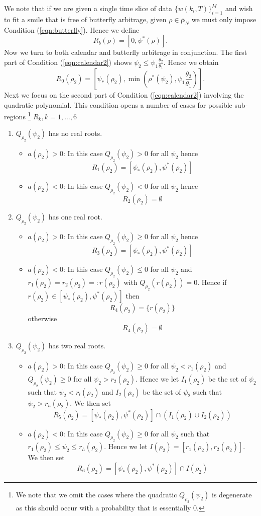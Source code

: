 \documentclass[11pt,letterpaper]{article}
\begin{document}
We note that if we are given a single time slice of data $\{w(k_i,T)\}_{i=1}^M$ and wish to fit a smile that is free of butterfly arbitrage, given $\rho \in \pmb{\rho}_N$ we must only impose Condition (\ref{eqn:butterfly}). Hence we define 
\[
R_b(\rho) = [0,\psi^*(\rho)].
\]
Now we turn to both calendar and butterfly arbitrage in conjunction. The first part of Condition (\ref{eqn:calendar2}) shows $\psi_2 \leq \psi_1 \frac{\theta_2}{\theta_1}$. Hence we obtain 
\[
R_0(\rho_2) = [\psi_*(\rho_2), \min(\rho^*(\psi_2), \psi_1 \frac{\theta_2}{\theta_1} )].
\]
Next we focus on the second part of Condition (\ref{eqn:calendar2}) involving the quadratic polynomial. This condition opens a number of cases for possible sub-regions \footnote{We note that we omit the cases where the quadratic $Q_{\rho_2}(\psi_2)$ is degenerate as this should occur with a probability that is essentially 0.} $R_k, k = 1,\ldots,6$ 
\begin{enumerate}
\item $Q_{\rho_2}(\psi_2)$ has no real roots.
\begin{itemize}
\item
$a(\rho_2) > 0 $: In this case $Q_{\rho_2}(\psi_2) > 0$ for all $\psi_2$ hence 
\[
R_1(\rho_2) = [\psi_*(\rho_2),\psi^*(\rho_2)]
\]
\item $a(\rho_2) < 0 $: In this case $Q_{\rho_2}(\psi_2) < 0$ for all $\psi_2$ hence
\[
R_2(\rho_2) = \emptyset
\]
\end{itemize}
\item $Q_{\rho_2}(\psi_2)$ has one real root.
\begin{itemize} 
\item $a(\rho_2) > 0$: In this case $Q_{\rho_2}(\psi_2) \geq 0$ for all $\psi_2$ hence 
\[
R_3(\rho_2) = [\psi_*(\rho_2),\psi^*(\rho_2)]
\]
\item $a(\rho_2) < 0$: In this case $Q_{\rho_2}(\psi_2) \leq 0$ for all $\psi_2$ and $r_1(\rho_2) = r_2(\rho_2) =: r(\rho_2)$ with  $Q_{\rho_2}(r(\rho_2)) = 0$. Hence if $r(\rho_2) \in [\psi_*(\rho_2),\psi^*(\rho_2)]$ then 
\[
R_4(\rho_2) = \{ r(\rho_2)  \}
\]
otherwise
\[
R_4(\rho_2) = \emptyset
\]
\end{itemize}
\item $Q_{\rho_2}(\psi_2)$ has two real roots. 
\begin{itemize}
\item $a(\rho_2) > 0$: In this case $Q_{\rho_2}(\psi_2) \geq 0$ for all $\psi_2 < r_1(\rho_2)$ and $Q_{\rho_2}(\psi_2) \geq 0$ for all $\psi_2 > r_2(\rho_2)$. Hence we let $I_1(\rho_2)$ be the set of $\psi_2$ such that $\psi_2 < r_l(\rho_2)$ and $I_2(\rho_2)$ be the set of $\psi_2$ such that $\psi_2 > r_h(\rho_2)$. We then set
\[
R_5(\rho_2) = [\psi_*(\rho_2),\psi^*(\rho_2)] \cap \left( I_1(\rho_2)  \cup I_2(\rho_2)   \right) 
\]
\item $a(\rho_2) <  0$: In this case $Q_{\rho_2}(\psi_2) \geq 0$ for all $\psi_2$ such that $r_1(\rho_2) \leq \psi_2 \leq r_h(\rho_2)$. Hence we let $I(\rho_2) = [r_1(\rho_2),r_2(\rho_2)]$. We then set 
\[
R_6(\rho_2) =  [\psi_*(\rho_2),\psi^*(\rho_2)] \cap I(\rho_2) 
\] 
\end{itemize}
\end{enumerate}
\end{document}
